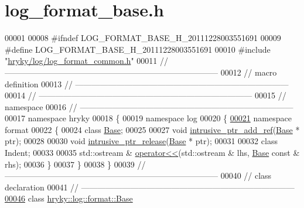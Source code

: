 \hypertarget{log__format__base_8h_source}{\section{log\-\_\-format\-\_\-base.\-h}
}

\begin{DoxyCode}
00001 
00008 \textcolor{preprocessor}{#ifndef LOG\_FORMAT\_BASE\_H\_20111228003551691}
00009 \textcolor{preprocessor}{}\textcolor{preprocessor}{#define LOG\_FORMAT\_BASE\_H\_20111228003551691}
00010 \textcolor{preprocessor}{}\textcolor{preprocessor}{#include "\hyperlink{log__format__common_8h}{hryky/log/log_format_common.h}"}
00011 \textcolor{comment}{//
      ------------------------------------------------------------------------------}
00012 \textcolor{comment}{// macro definition}
00013 \textcolor{comment}{//
      ------------------------------------------------------------------------------}
00014 \textcolor{comment}{//
      ------------------------------------------------------------------------------}
00015 \textcolor{comment}{// namespace}
00016 \textcolor{comment}{//
      ------------------------------------------------------------------------------}
00017 \textcolor{keyword}{namespace }hryky
00018 \{
00019 \textcolor{keyword}{namespace }log
00020 \{
\hypertarget{log__format__base_8h_source_l00021}{}\hyperlink{namespacehryky_1_1log_1_1format}{00021} \textcolor{keyword}{namespace }format
00022 \{
00024     \textcolor{keyword}{class }\hyperlink{classhryky_1_1log_1_1format_1_1_base}{Base};
00025 
00027     \textcolor{keywordtype}{void} \hyperlink{namespacehryky_1_1log_1_1format_a8c68e3857a07b98886447e4885fd7dec}{intrusive_ptr_add_ref}(\hyperlink{classhryky_1_1log_1_1format_1_1_base}{Base} * ptr);
00028 
00030     \textcolor{keywordtype}{void} \hyperlink{namespacehryky_1_1log_1_1format_a6c8a33920b836a83719293661e02f060}{intrusive_ptr_release}(\hyperlink{classhryky_1_1log_1_1format_1_1_base}{Base} * ptr);
00031 
00032     \textcolor{keyword}{class }Indent;
00033 
00035     std::ostream & \hyperlink{namespacehryky_1_1log_1_1format_ad214f866f3f6ebc919c87f9f03132f17}{operator<<}(std::ostream & lhs, \hyperlink{classhryky_1_1log_1_1format_1_1_base}{Base} \textcolor{keyword}{const} & rhs);
00036 \}
00037 \}
00038 \}
00039 \textcolor{comment}{//
      ------------------------------------------------------------------------------}
00040 \textcolor{comment}{// class declaration}
00041 \textcolor{comment}{//
      ------------------------------------------------------------------------------}
\hypertarget{log__format__base_8h_source_l00046}{}\hyperlink{classhryky_1_1log_1_1format_1_1_base}{00046} \textcolor{comment}{}\textcolor{keyword}{class }\hyperlink{classhryky_1_1log_1_1format_1_1_base}{hryky::log::format::Base}

\end{DoxyCode}
